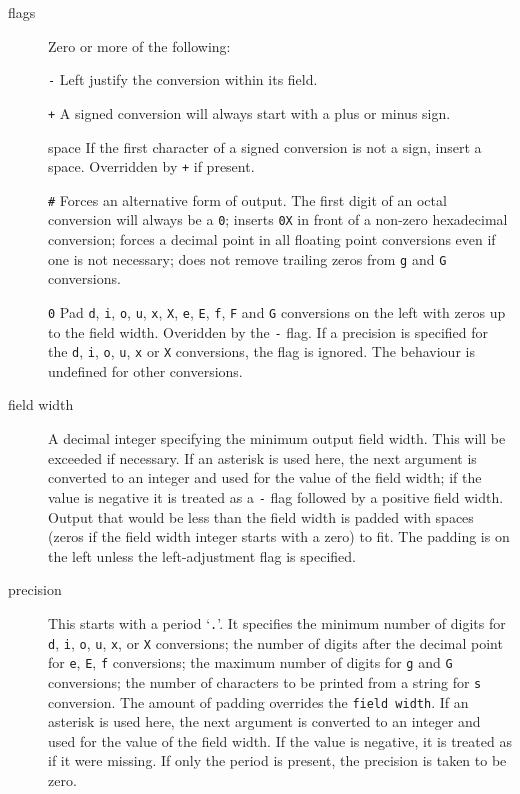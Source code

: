    \begin{description}
    \item[flags] 
     Zero or more of the following:

      \texttt{-}
      Left justify the conversion within its field.


      \texttt{+}
      A signed conversion will always start with a  plus  or
       minus sign.


      space
      If the first character of a signed conversion is not a
       sign, insert a space.  Overridden by \texttt{+} if present.


      \texttt{\#}
      Forces an alternative form of output.  The first digit
       of  an octal conversion will always be a \texttt{0}; inserts
       \texttt{0X} in front of a non-zero hexadecimal conversion;  forces
       a decimal point in all floating point conversions even
       if one is not  necessary;  does  not  remove  trailing
       zeros from \texttt{g} and \texttt{G} conversions.


      \texttt{0}
      Pad \texttt{d}, \texttt{i}, \texttt{o}, \texttt{u},
       \texttt{x}, \texttt{X}, \texttt{e}, \texttt{E},
       \texttt{f}, \texttt{F} and \texttt{G} conversions  on
       the  left with zeros up to the field width.  Overidden
       by the \texttt{-} flag.  If a precision is specified for the
       \texttt{d}, \texttt{i}, \texttt{o}, \texttt{u},
       \texttt{x} or \texttt{X} conversions, the flag is ignored.  The
       behaviour is undefined for other conversions.

    
   

   \item[field width] A decimal integer specifying  the  minimum  output  field width.   This
    will  be  exceeded  if  necessary.   If an asterisk is used here, the next
    argument is converted  to an  integer and used for the value of the field
    width; if the value is negative it is treated as a \texttt{-} flag
    followed by  a  positive  field  width.  Output that would be less than the
    field width is padded with spaces (zeros if  the field width
    integer  starts  with  a zero) to fit.  The padding is on the left unless
    the left-adjustment flag is specified.

   \item[precision] This starts with a period `\texttt{.}'.  It specifies the
    minimum number of digits for \texttt{d}, \texttt{i},
    \texttt{o}, \texttt{u}, \texttt{x}, or \texttt{X}
    conversions; the number of digits after the decimal  point  for
    \texttt{e}, \texttt{E}, \texttt{f} conversions;  the  maximum
    number  of digits for \texttt{g} and \texttt{G} conversions; the
    number of characters to be printed  from a  string  for  \texttt{s}
    conversion.  The  amount  of  padding overrides the \texttt{field
    width}.  If an asterisk is used  here, the next argument is converted
    to an integer and used for the value of the field width. If the value  is
    negative, it  is treated as if it were missing.  If only the period is
    present, the precision is taken to be zero.


\end{description}
